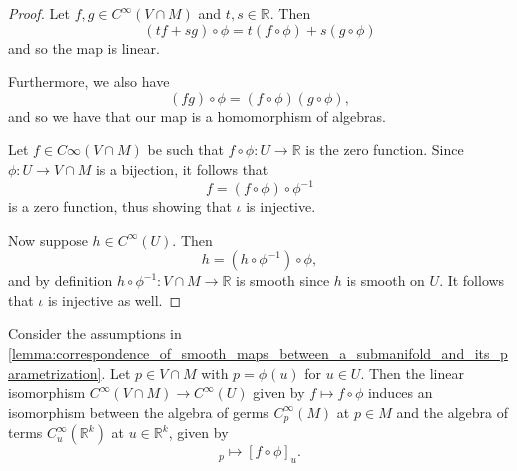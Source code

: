 \documentclass[notoc,notitlepage]{tufte-book}
\begin{document}
\begin{proof}
   Let $f, g \in C^\infty(V \cap M)$ and $t,
  s \in \mathbb{R}$. Then
  \begin{equation*}
    (tf + sg) \circ \phi = t(f \circ \phi) + s(g \circ \phi)
  \end{equation*}
  and so the map is linear.

  \noindent
   Furthermore, we also have
  \begin{equation*}
    (fg) \circ \phi = (f \circ \phi)(g \circ \phi),
  \end{equation*}
  and so we have that our map is a homomorphism of algebras.

  \noindent
   Let $f \in C\infty(V \cap M)$
  be such that $f \circ \phi : U \to \mathbb{R}$ is the zero function. Since
  $\phi : U \to V \cap M$ is a bijection, it follows that
  \begin{equation*}
    f = (f \circ \phi) \circ \phi^{-1}
  \end{equation*}
  is a zero function, thus showing that $\iota$ is injective.

  Now suppose $h \in C^{\infty}(U)$. Then
  \begin{equation*}
    h = (h \circ \phi^{-1}) \circ \phi,
  \end{equation*}
  and by definition $h \circ \phi^{-1} : V \cap M \to \mathbb{R}$ is smooth
  since $h$ is smooth on $U$. It follows that $\iota$ is injective as well.
\end{proof}

\begin{crly}\label{crly:isomorphism_between_algebra_of_germs}
  Consider the assumptions in
  \cref{lemma:correspondence_of_smooth_maps_between_a_submanifold_and_its_parametrization}.
  Let $p \in V \cap M$ with $p = \phi(u)$ for $u \in U$. Then the linear
  isomorphism $C^\infty (V \cap M) \to C^\infty (U)$ given by $f \mapsto f \circ
  \phi$ induces an isomorphism between the algebra of germs $C_p^\infty(M)$ at
  $p \in M$ and the algebra of terms $C_u^\infty(\mathbb{R}^k)$ at $u \in
  \mathbb{R}^k$, given by
  \begin{equation*}
    [f]_p \mapsto [f \circ \phi]_u.
  \end{equation*}
\end{crly}
\end{document}
